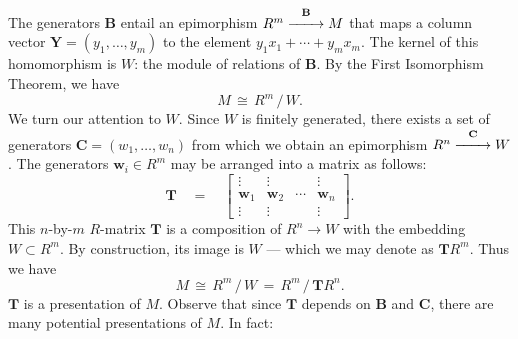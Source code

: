 \documentclass[11pt]{article}
\renewcommand{\longrightarrow}{\xrightarrow{\hspace*{0.7cm}}}
\renewcommand{\vec}[1]{\mathbf{#1}}
\newcommand{\mat}[1]{\mathbf{#1}}
\begin{document}
The generators $\vec{B}$ entail an epimorphism $R^{m} \stackrel{\vec{B}}{\longrightarrow} M$ that maps a column vector $\vec{Y} = (y_{1}, \ldots, y_{m})$ to the element $y_{1}x_{1} + \cdots + y_{m}x_{m}$. The kernel of this homomorphism is $W$: the module of relations of $\vec{B}$. By the First Isomorphism Theorem, we have
\[
  M \, \cong \, R^{m} \, / \, W.
\]
We turn our attention to $W$. Since $W$ is finitely generated, there exists a set of generators $\vec{C} = (w_{1}, \ldots, w_{n})$ from which we obtain an epimorphism $R^{n} \stackrel{\vec{C}}{\longrightarrow} W$. The generators $\vec{w}_{i} \in R^{m}$ may be arranged into a matrix as follows:
\[
  \mat{T} \quad = \quad \begin{bmatrix} \vdots & \vdots & \, & \vdots \\ \vec{w}_{1} & \vec{w}_{2} & \cdots & \vec{w}_{n} \\ \vdots & \vdots & \, & \vdots \end{bmatrix}.
\]
This $n$-by-$m$ $R$-matrix $\mat{T}$ is a composition of $R^{n} \to W$ with the embedding $W \subset R^{m}$. By construction, its image is $W$ --- which we may denote as $\mat{T}R^{m}$. Thus we have
\[
  M \, \cong \, R^{m} \, / \, W \, = \, R^{m} \, / \, \mat{T}R^{n}.
\]
$\mat{T}$ is a presentation of $M$. Observe that since $\mat{T}$ depends on $\vec{B}$ and $\vec{C}$, there are many potential presentations of $M$. In fact:
\end{document}
